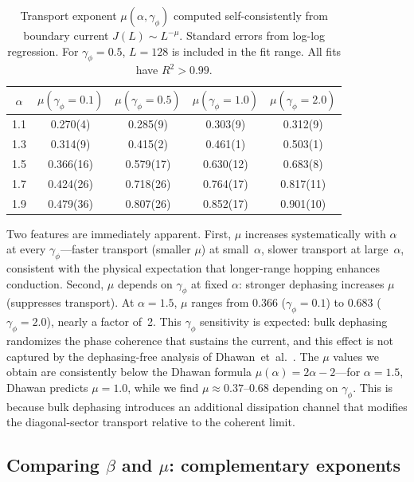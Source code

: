 \documentclass[aps,prb,twocolumn,superscriptaddress,floatfix]{revtex4-2}
\begin{document}
\begin{table}[tbp]
\caption{Transport exponent $\mu(\alpha, \gamma_\phi)$ computed self-consistently from boundary current $J(L) \sim L^{-\mu}$. Standard errors from log-log regression. For $\gamma_\phi = 0.5$, $L = 128$ is included in the fit range. All fits have $R^2 > 0.99$.}
\label{tab:mu}
\begin{ruledtabular}
\begin{tabular}{ccccc}
$\alpha$ & $\mu(\gamma_\phi\!=\!0.1)$ & $\mu(\gamma_\phi\!=\!0.5)$ & $\mu(\gamma_\phi\!=\!1.0)$ & $\mu(\gamma_\phi\!=\!2.0)$ \\
\hline
1.1 & 0.270(4) & 0.285(9) & 0.303(9) & 0.312(9) \\
1.3 & 0.314(9) & 0.415(2) & 0.461(1) & 0.503(1) \\
1.5 & 0.366(16) & 0.579(17) & 0.630(12) & 0.683(8) \\
1.7 & 0.424(26) & 0.718(26) & 0.764(17) & 0.817(11) \\
1.9 & 0.479(36) & 0.807(26) & 0.852(17) & 0.901(10)
\end{tabular}
\end{ruledtabular}
\end{table}

Two features are immediately apparent. First, $\mu$ increases systematically with $\alpha$ at every $\gamma_\phi$---faster transport (smaller $\mu$) at small~$\alpha$, slower transport at large~$\alpha$, consistent with the physical expectation that longer-range hopping enhances conduction. Second, $\mu$ depends on $\gamma_\phi$ at fixed $\alpha$: stronger dephasing increases $\mu$ (suppresses transport). At $\alpha = 1.5$, $\mu$ ranges from $0.366$ ($\gamma_\phi = 0.1$) to $0.683$ ($\gamma_\phi = 2.0$), nearly a factor of~2. This $\gamma_\phi$ sensitivity is expected: bulk dephasing randomizes the phase coherence that sustains the current, and this effect is not captured by the dephasing-free analysis of Dhawan~et~al.~\cite{Dhawan2024}. The $\mu$ values we obtain are consistently below the Dhawan formula $\mu(\alpha) = 2\alpha - 2$---for $\alpha = 1.5$, Dhawan predicts $\mu = 1.0$, while we find $\mu \approx 0.37$--$0.68$ depending on $\gamma_\phi$. This is because bulk dephasing introduces an additional dissipation channel that modifies the diagonal-sector transport relative to the coherent limit.

\subsection{Comparing $\beta$ and $\mu$: complementary exponents}
\label{sec:compare}
\end{document}
